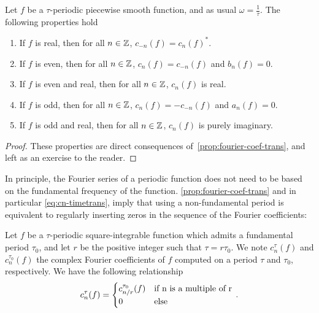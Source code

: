 \begin{proposition}
  Let $f$ be a $\tau$-periodic piecewise smooth function, and as usual
  $\omega=\frac{1}{\tau}$. The following properties hold
  \begin{enumerate}
    \item If $f$ is real, then for all $n\in\mathbb{Z}$, $c_{-n}(f)=c_{n}(f)^*$.
    \item If $f$ is even, then for all $n\in\mathbb{Z}$, $c_{n}(f)=c_{-n}(f)$ and $b_n(f)=0$.
    \item If $f$ is even and real, then for all $n\in\mathbb{Z}$, $c_n(f)$ is real.
    \item If $f$ is odd, then for all $n\in\mathbb{Z}$, $c_{n}(f)=-c_{-n}(f)$ and $a_n(f)=0$.
    \item If $f$ is odd and real, then for all $n\in\mathbb{Z}$, $c_n(f)$ is purely imaginary.
  \end{enumerate}
\end{proposition}
\begin{proof}
  These properties are direct consequences of~\cref{prop:fourier-coef-trans}, and left as
  an exercise to the reader.
\end{proof}
In principle, the Fourier series of a periodic function does not need to be based on the
fundamental frequency of the function. \cref{prop:fourier-coef-trans} and in particular
\cref{eq:cn-timetrans}, imply that using a non-fundamental period is equivalent to
regularly inserting zeros in the sequence of the Fourier coefficients:
\begin{proposition}
  Let $f$ be a $\tau$-periodic square-integrable function which admits a fundamental
  period $\tau_0$, and let $r$ be the positive integer such that $\tau=r\tau_0$. We note
  $c_n^\tau(f)$ and $c_n^{\tau_0}(f)$ the complex Fourier coefficients of $f$ computed on
  a period $\tau$ and $\tau_0$, respectively. We have the following relationship
  \begin{equation}
    c_n^\tau(f)=
    \begin{cases}
      c_{n/r}^{\tau_0}(f)&\text{if}~$n$~\text{is a multiple of}~$r$\\
      0&\text{else}
    \end{cases}\,.
  \end{equation}
\end{proposition}
